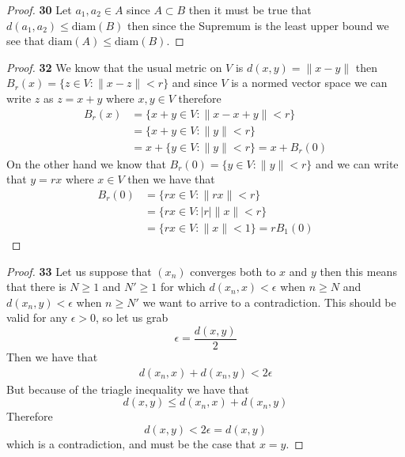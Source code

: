 \documentclass[11pt]{article}
\theoremstyle{definition}
\begin{document}
    \begin{proof}{\textbf{30}}
        Let $a_1, a_2 \in A$ since $A \subset B$ then it must be true that\\
        $d(a_1, a_2) \leq \text{diam}(B)$ then since the Supremum is the least upper bound
        we see that $\text{diam}(A) \leq \text{diam}(B)$.
    \end{proof}
    \begin{proof}{\textbf{32}}
        We know that the usual metric on $V$ is $d(x,y) = \|x -y\|$ then 
        $B_r(x) = \{z \in V: \|x-z\| < r\}$ and since $V$ is a normed vector space we 
        can write $z$ as $z = x + y$ where $x,y \in V$ therefore
        \begin{align*}
            B_r(x) &= \{x + y \in V: \|x- x + y\| < r\}\\
                &= \{x+y \in V: \|y\| < r\}\\
                &= x + \{y \in V: \|y\| < r\} = x + B_r(0)
        \end{align*}
        On the other hand we know that $B_r(0) = \{y \in V: \|y\| < r\}$ and we can
        write that $y = rx$ where $x \in V$ then we have that
        \begin{align*}
            B_r(0) &= \{rx\in V: \|rx\| < r\}\\
                &= \{rx\in V: |r|\|x\| < r\}\\
                &= \{rx\in V: \|x\| < 1\} = rB_1(0)
        \end{align*}
    \end{proof} 
    \begin{proof}{\textbf{33}}
        Let us suppose that $(x_n)$ converges both to $x$ and $y$ then this means that
        there is $N \geq 1$ and $N' \geq 1$ for which $d(x_n,x)< \epsilon$ when
        $n \geq N$ and $d(x_n,y)< \epsilon$ when $n \geq N'$ we want to arrive
        to a contradiction. This should be valid for any $\epsilon > 0$, so let us grab
        $$\epsilon = \frac{d(x,y)}{2}$$
        Then we have that
        \begin{align*}
            d(x_n,x) + d(x_n, y) < 2\epsilon
        \end{align*}
        But because of the triagle inequality we have that
        $$d(x,y) \leq d(x_n, x) + d(x_n, y)$$
        Therefore
        $$d(x,y) < 2\epsilon = d(x,y)$$
        which is a contradiction, and must be the case that $x = y$.
    \end{proof}
\end{document}
